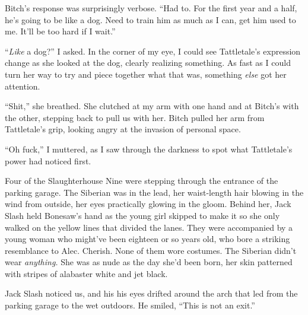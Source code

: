 Bitch's response was surprisingly verbose.  ``Had to.  For the first year and a half, he's going to be like a dog.  Need to train him as much as I can, get him used to me.  It'll be too hard if I wait.''



``\emph{Like} a dog?'' I asked.  In the corner of my eye, I could see Tattletale's expression change as she looked at the dog, clearly realizing something.  As fast as I could turn her way to try and piece together what that was, something \emph{else} got her attention.



``Shit,'' she breathed.  She clutched at my arm with one hand and at Bitch's with the other, stepping back to pull us with her.  Bitch pulled her arm from Tattletale's grip, looking angry at the invasion of personal space.



``Oh fuck,'' I muttered, as I saw through the darkness to spot what Tattletale's power had noticed first.



Four of the Slaughterhouse Nine were stepping through the entrance of the parking garage.  The Siberian was in the lead, her waist-length hair blowing in the wind from outside, her eyes practically glowing in the gloom.  Behind her, Jack Slash held Bonesaw's hand as the young girl skipped to make it so she only walked on the yellow lines that divided the lanes.  They were accompanied by a young woman who might've been eighteen or so years old, who bore a striking resemblance to Alec.  Cherish.  None of them wore costumes.  The Siberian didn't wear \emph{anything.}  She was as nude as the day she'd been born, her skin patterned with stripes of alabaster white and jet black.



Jack Slash noticed us, and his his eyes drifted around the arch that led from the parking garage to the wet outdoors.  He smiled, ``This is not an exit.''





